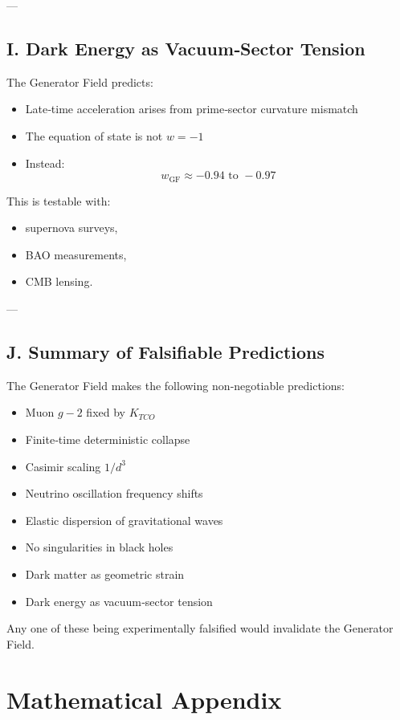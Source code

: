 \documentclass[reprint,amsmath,amssymb,aps,prl,floatfix]{revtex4-2}
\begin{document}
\begin{itemize}
---

\subsection{I. Dark Energy as Vacuum‑Sector Tension}

The Generator Field predicts:

\begin{itemize}
\item Late‑time acceleration arises from prime‑sector curvature mismatch  
\item The equation of state is not \(w = -1\)  
\item Instead:  
  \[
  w_{\mathrm{GF}} \approx -0.94 \text{ to } -0.97
  \]
\end{itemize}

This is testable with:

\begin{itemize}
\item supernova surveys,  
\item BAO measurements,  
\item CMB lensing.
\end{itemize}

---

\subsection{J. Summary of Falsifiable Predictions}

The Generator Field makes the following non‑negotiable predictions:

\begin{itemize}
\item Muon \(g-2\) fixed by \(K_{TCO}\)  
\item Finite‑time deterministic collapse  
\item Casimir scaling \(1/d^3\)  
\item Neutrino oscillation frequency shifts  
\item Elastic dispersion of gravitational waves  
\item No singularities in black holes  
\item Dark matter as geometric strain  
\item Dark energy as vacuum‑sector tension
\end{itemize}

Any one of these being experimentally falsified would invalidate the Generator Field.

\section{Mathematical Appendix}


\end{itemize}
\end{document}
